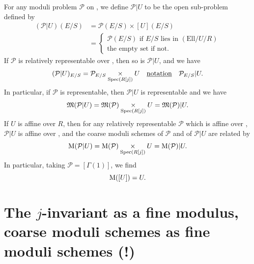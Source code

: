 \kmitem\label{item:8.3.2}
For any moduli problem $\mathcal{P}$ on \EllR, we define $\mathcal{P}|U$ to be the open sub-problem defined by
\begin{equation}\label{eq:8.3.2.1}
\begin{aligned}
(\mathcal{P}|U)(E/S) &= \mathcal{P}(E/S) \times [U](E/S) \\
&= \left\{
\begin{array}{l}
\mathcal{P}(E/S) \text{ if } E/S \text{ lies in } (\mathrm{Ell}/U/R) \\
\text{the empty set if not.}
\end{array}
\right.
\end{aligned}
\end{equation}
If $\mathcal{P}$ is relatively representable over \EllR, then so is $\mathcal{P}|U$, and we have
\begin{equation}\label{eq:8.3.2.2}
(\mathcal{P}|U)_{E/S} = \mathcal{P}_{E/S} \underset{\operatorname{Spec}(R[j])}{\times} U \quad \underline{\text{notation}} \quad \mathcal{P}_{E/S}|U .
\end{equation}
In particular, if $\mathcal{P}$ is representable, then $\mathcal{P}|U$ is representable and we have
\begin{equation}\label{eq:8.3.2.3}
\mathfrak{M}(\mathcal{P}|U) = \mathfrak{M}(\mathcal{P}) \underset{\operatorname{Spec}(R[j])}{\times} U = \mathfrak{M}(\mathcal{P})|U .
\end{equation}
If $U$ is affine over $R$, then for any relatively representable $\mathcal{P}$ which is affine over \EllR, $\mathcal{P}|U$ is affine over \EllR, and the coarse moduli schemes of $\mathcal{P}$ and of $\mathcal{P}|U$ are related by
\begin{equation}\label{eq:8.3.2.4}
\mathrm{M}(\mathcal{P}|U) = \mathrm{M}(\mathcal{P}) \underset{\operatorname{Spec}(R[j])}{\times} U = \mathrm{M}(\mathcal{P})|U .
\end{equation}
In particular, taking $\mathcal{P} = [\Gamma(1)]$, we find
\begin{equation}\label{eq:8.3.2.5}
\mathrm{M}([U]) = U .
\end{equation}

\section{The $j$-invariant as a fine modulus, coarse moduli schemes as fine moduli schemes (!)}
\label{sec:8.4}

